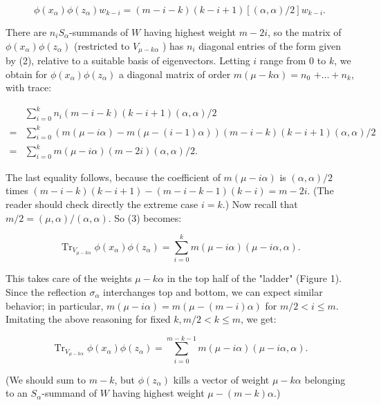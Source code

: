\documentclass[10pt]{article}
\begin{document}
\begin{equation*}
\phi\left(x_{\alpha}\right) \phi\left(z_{\alpha}\right) w_{k-i}=(m-i-k)(k-i+1)[(\alpha, \alpha) / 2] w_{k-i} . \tag{2}
\end{equation*}


There are $n_{i} S_{\alpha}$-summands of $W$ having highest weight $m-2 i$, so the matrix of $\phi\left(x_{\alpha}\right) \phi\left(z_{\alpha}\right)$ (restricted to $V_{\mu-k \alpha}$ ) has $n_{i}$ diagonal entries of the form given by (2), relative to a suitable basis of eigenvectors. Letting $i$ range from 0 to $k$, we obtain for $\phi\left(x_{\alpha}\right) \phi\left(z_{\alpha}\right)$ a diagonal matrix of order $m(\mu-k \alpha)=n_{0}$ $+\ldots+n_{k}$, with trace:


\begin{align*}
& \sum_{i=0}^{k} n_{i}(m-i-k)(k-i+1)(\alpha, \alpha) / 2  \tag{3}\\
= & \sum_{i=0}^{k}(m(\mu-i \alpha)-m(\mu-(i-1) \alpha))(m-i-k)(k-i+1)(\alpha, \alpha) / 2 \\
= & \sum_{i=0}^{k} m(\mu-i \alpha)(m-2 i)(\alpha, \alpha) / 2 .
\end{align*}


The last equality follows, because the coefficient of $m(\mu-i \alpha)$ is $(\alpha, \alpha) / 2$ times $(m-i-k)(k-i+1)-(m-i-k-1)(k-i)=m-2 i$. (The reader should check directly the extreme case $i=k$.) Now recall that $m / 2=(\mu, \alpha) /(\alpha, \alpha)$. So (3) becomes:


\begin{equation*}
\operatorname{Tr}_{V_{\mu-k \alpha}} \phi\left(x_{\alpha}\right) \phi\left(z_{\alpha}\right)=\sum_{i=0}^{k} m(\mu-i \alpha)(\mu-i \alpha, \alpha) . \tag{4}
\end{equation*}


This takes care of the weights $\mu-k \alpha$ in the top half of the "ladder" (Figure 1). Since the reflection $\sigma_{\alpha}$ interchanges top and bottom, we can expect similar behavior; in particular, $m(\mu-i \alpha)=m(\mu-(m-i) \alpha)$ for $m / 2<i \leq m$. Imitating the above reasoning for fixed $k, m / 2<k \leq m$, we get:


\begin{equation*}
\operatorname{Tr}_{V_{\mu-k \alpha}} \phi\left(x_{\alpha}\right) \phi\left(z_{\alpha}\right)=\sum_{i=0}^{m-k-1} m(\mu-i \alpha)(\mu-i \alpha, \alpha) . \tag{5}
\end{equation*}


(We should sum to $m-k$, but $\phi\left(z_{\alpha}\right)$ kills a vector of weight $\mu-k \alpha$ belonging to an $S_{\alpha}$-summand of $W$ having highest weight $\mu-(m-k) \alpha$.)
\end{document}
